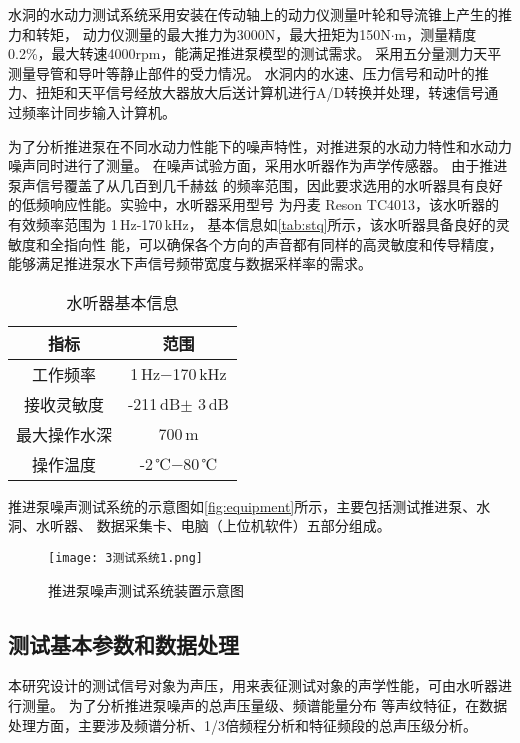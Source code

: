 水洞的水动力测试系统采用安装在传动轴上的动力仪测量叶轮和导流锥上产生的推力和转矩，
动力仪测量的最大推力为3000N，最大扭矩为150N$\cdot$m，测量精度0.2\%，最大转速4000rpm，能满足推进泵模型的测试需求。
采用五分量测力天平测量导管和导叶等静止部件的受力情况。
水洞内的水速、压力信号和动叶的推力、扭矩和天平信号经放大器放大后送计算机进行A/D转换并处理，转速信号通过频率计同步输入计算机。

为了分析推进泵在不同水动力性能下的噪声特性，对推进泵的水动力特性和水动力噪声同时进行了测量。
在噪声试验方面，采用水听器作为声学传感器。
由于推进泵声信号覆盖了从几百到几千赫兹
的频率范围，因此要求选用的水听器具有良好的低频响应性能。实验中，水听器采用型号
为丹麦 Reson TC4013，该水听器的有效频率范围为 1\,Hz-170\,kHz，
基本信息如\autoref{tab:stq}所示，该水听器具备良好的灵敏度和全指向性
能，可以确保各个方向的声音都有同样的高灵敏度和传导精度，能够满足推进泵水下声信号频带宽度与数据采样率的需求。
\begin{table}[htbp]
    \centering
    \caption{\label{tab:stq}水听器基本信息}
    \begin{tabular}{cc}
     \toprule
     指标&范围\\
     \midrule
     工作频率&1\,Hz$- $170\,kHz\\
     接收灵敏度&-211\,dB$\pm$ 3\,dB\\
     最大操作水深&700\,m\\
     操作温度&-2\,℃$- $80\,℃\\
     \bottomrule
    \end{tabular}
\end{table}

推进泵噪声测试系统的示意图如\autoref{fig:equipment}所示，主要包括测试推进泵、水洞、水听器、
数据采集卡、电脑（上位机软件）五部分组成。
\begin{figure}[htbp]
    \centering
    \texttt{[image: 3测试系统1.png]}
    \caption{\label{fig:equipment}推进泵噪声测试系统装置示意图}
\end{figure}

\subsection{测试基本参数和数据处理}
本研究设计的测试信号对象为声压，用来表征测试对象的声学性能，可由水听器进行测量。
为了分析推进泵噪声的总声压量级、频谱能量分布
等声纹特征，在数据处理方面，主要涉及频谱分析、1/3倍频程分析和特征频段的总声压级分析。

